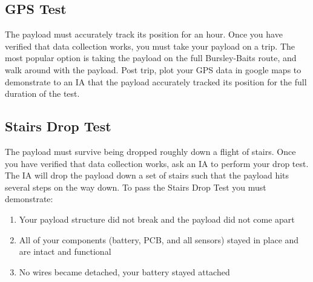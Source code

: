 \documentclass[12pt]{article}
\begin{document}
    
    \subsection*{GPS Test}
    The payload must accurately track its position for an hour.
    \newline \newline
    Once you have verified that data collection works, you must take your payload on a trip. The most popular option is taking the payload on the full Bursley-Baits route, and walk around with the payload. Post trip, plot your GPS data in google maps to demonstrate to an IA that the payload accurately tracked its position for the full duration of the test.
    
    \subsection*{Stairs Drop Test}
    The payload must survive being dropped roughly down a flight of stairs.\newline \newline
    Once you have verified that data collection works, ask an IA to perform your drop test. The IA will drop the payload down a set of stairs such that the payload hits several steps on the way down.\newline \newline
    To pass the Stairs Drop Test you must demonstrate:
    \begin{enumerate}
        \item Your payload structure did not break and the payload did not come apart
        \item All of your components (battery, PCB, and all sensors) stayed in place and are intact and functional
        \item No wires became detached, your battery stayed attached
    \end{enumerate}
    
\end{document}
